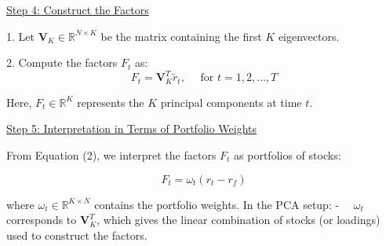 \documentclass[12pt,article]{memoir}
\begin{document}
\underline{Step 4: Construct the Factors}

1. Let $\mathbf{V}_K \in \mathbb{R}^{N \times K}$ be the matrix containing the first $K$ eigenvectors.

2. Compute the factors $F_t$ as:
$$
F_t=\mathbf{V}_K^T \tilde{r}_t, \quad \text { for } t=1,2, \ldots, T
$$


Here, $F_t \in \mathbb{R}^K$ represents the $K$ principal components at time $t$.



\underline{Step 5: Interpretation in Terms of Portfolio Weights}

From Equation (2), we interpret the factors $F_t$ as portfolios of stocks:

$$
F_t=\omega_t\left(r_t-r_f\right)
$$

where $\omega_t \in \mathbb{R}^{K \times N}$ contains the portfolio weights. In the PCA setup:
- $\quad \omega_t$ corresponds to $\mathbf{V}_K^T$, which gives the linear combination of stocks (or loadings) used to construct the factors.

\end{document}

